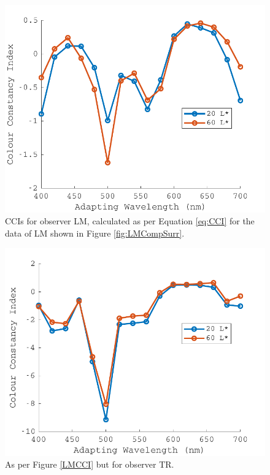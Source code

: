 \begin{figure}[htbp]
\includegraphics[max width=\textwidth]{figs/LargeSphere/LMCCI.pdf}
\caption{\Glspl{CCI} for observer LM, calculated as per Equation \ref{eq:CCI} for the data of LM shown in Figure \ref{fig:LMCompSurr}.}
\label{fig:LMCCI}
\end{figure}

\begin{figure}[htbp]
\includegraphics[max width=\textwidth]{figs/LargeSphere/TRCCI.pdf}
\caption{As per Figure \ref{LMCCI} but for observer TR.}
\label{fig:TRCCI}
\end{figure}


